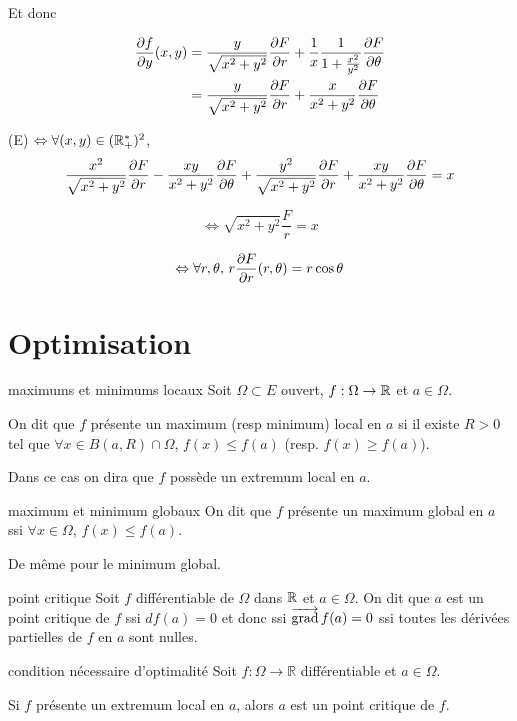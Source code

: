 Et donc 

\begin{align}
    \frac{\partial f}{\partial y} (x, y) & = \frac y {\sqrt{x^2 + y^2}} \frac{\partial F}{\partial r} + \frac 1 x \frac{1}{1 + \frac{x^2}{y^2}} \frac{\partial F}{\partial \theta} \\
    & = \frac y {\sqrt{x^2 + y^2}} \frac{\partial F}{\partial r} + \frac x {x^2 + y^2} \frac{\partial F}{\partial \theta}
\end{align}

(E) $ \Leftrightarrow \forall (x, y) \in (\mathbb{R}_+^*)^2$,
$$ \frac{x^2 }{\sqrt{x^2 + y^2}} \frac{\partial F}{\partial r} - \frac{xy}{x^2 + y^2} \frac{\partial F}{\partial \theta} + \frac{y^2}{\sqrt{x^2 + y^2}} \frac{\partial F}{\partial r} + \frac{xy}{x^2 + y^2} \frac{\partial F}{\partial \theta} = x$$

$$\Leftrightarrow \sqrt{x^2 + y^2} \frac F r = x$$

$$\Leftrightarrow \forall r, \theta, \, r \frac{\partial F}{\partial r} (r, \theta) = r \cos \theta$$


\section{Optimisation }

\begin{definition}{maximums et minimums locaux}{}
    Soit $\Omega \subset E$ ouvert, $f : \Omega \to \mathbb{R}$ et $a \in \Omega$.

    On dit que $f$ présente un maximum (resp minimum) local en $a$ si il existe $R > 0$ 
    tel que $\forall x \in B(a, R) \cap \Omega$, $f(x) \leqslant f(a)$ (resp. $f(x) \geqslant f(a)$).

    Dans ce cas on dira que $f$ possède un extremum local en $a$. 
\end{definition}

\begin{definition}{maximum et minimum globaux}{}
    On dit que $f$ présente un maximum global en $a$ ssi $\forall x \in \Omega$, $f(x) \leqslant f(a)$.

    De même pour le minimum global.
\end{definition}

\begin{definition}{point critique}{}
    Soit $f$ différentiable de $\Omega$ dans $\mathbb{R}$ et $a \in \Omega$. On dit que $a$ est un point critique de $f$ ssi
    $df(a) = 0$ et donc ssi $\overrightarrow{\operatorname{grad}} \, f(a) = 0$ ssi toutes les dérivées partielles de $f$ en $a$ sont nulles.
\end{definition}

\begin{theoreme}{condition nécessaire d'optimalité}{}
    Soit $f : \Omega \to \mathbb R$ différentiable et $a \in \Omega$. 

    Si $f$ présente un extremum local en $a$, alors $a$ est un point critique de $f$.
\end{theoreme}

